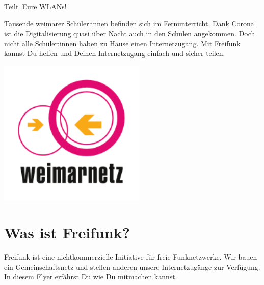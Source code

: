 \documentclass[10pt,a4paper,notumble]{leaflet}
\begin{document}


\begin{center}
{\fontsize{70}{90}\selectfont \faWifi}
\end{center}
\begin{center}
{\fontsize{30}{40}\selectfont Teilt\ Eure WLANs!}
\end{center}

\vfill

{\fontsize{16}{18}\selectfont Tausende weimarer Schüler:innen befinden sich im Fernunterricht. Dank Corona ist die Digitalisierung quasi über Nacht auch in den Schulen angekommen. Doch nicht alle Schüler:innen haben zu Hause einen Internetzugang. Mit Freifunk kannst Du helfen und Deinen Internetzugang einfach und sicher teilen.\par}

\vspace{1em}

\begin{center}
\includegraphics[width=70mm]{weimarnetz_logo.png}
\end{center}


\thispagestyle{empty}
\newpage

\section{Was ist Freifunk?}
Freifunk ist eine nichtkommerzielle Initiative für freie Funk\-netzwerke. Wir bauen ein Gemeinschaftsnetz und stellen anderen unsere Internetzugänge zur Verfügung. In diesem Flyer erfährst Du wie Du mitmachen kannst.
\end{document}
